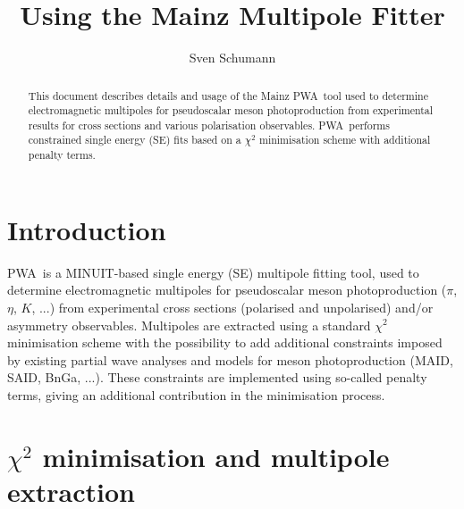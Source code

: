 \documentclass[a4paper,10pt]{article}
\title{Using the Mainz Multipole Fitter \PWA}
\author{Sven Schumann}
\def\PWA{\ttfamily PWA\rmfamily\ }
\begin{document}
\maketitle

\begin{abstract}
\hspace{-1.5em}This document describes details and usage of the Mainz \PWA tool used to determine electromagnetic multipoles
for pseudoscalar meson photoproduction from experimental results for cross sections and various polarisation
observables. \PWA performs constrained single energy (SE) fits based on a $\chi^2$ minimisation scheme with additional
penalty terms.
\end{abstract}

\section{Introduction}

\PWA is a MINUIT-based single energy (SE) multipole fitting tool, used to determine electromagnetic multipoles for pseudoscalar
meson photoproduction ($\pi$, $\eta$, $K$, ...) from experimental cross sections (polarised and unpolarised)
and/or asymmetry observables. Multipoles are extracted using a standard $\chi^2$ minimisation scheme with the
possibility to add additional constraints imposed by existing partial wave analyses and models for meson photoproduction
(MAID, SAID, BnGa, ...). These constraints are implemented using so-called penalty terms, giving an additional
contribution in the minimisation process.

\section{$\chi^2$ minimisation and multipole extraction}
\end{document}
